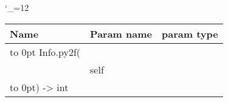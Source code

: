 \begingroup \catcode`\_=12 \tt
\begin{tabular}{lll}
\toprule
\textrm{Name}&\textrm{Param name}&\textrm{param type}\\
\midrule
\hbox to 0pt {Info.py2f(\hss}\\
& self\\
\hbox to 0pt{) -> int\hss}\\
\bottomrule
\end{tabular}
\endgroup
